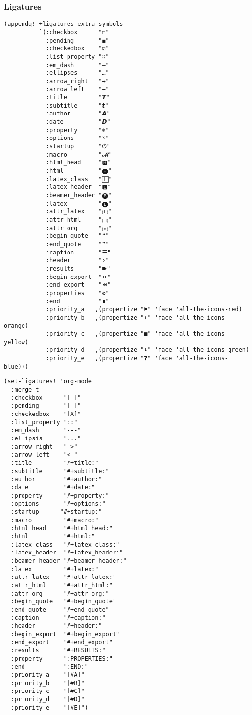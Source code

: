 \documentclass[c]{article}
\theoremstyle{plain}%
\theoremstyle{definition}
\theoremstyle{remark}
\begin{document}
\subsubsection{Ligatures}
\label{sec:orgd05717a}
\begin{verbatim}
(appendq! +ligatures-extra-symbols
          `(:checkbox      "☐"
            :pending       "◼"
            :checkedbox    "☑"
            :list_property "∷"
            :em_dash       "—"
            :ellipses      "…"
            :arrow_right   "→"
            :arrow_left    "←"
            :title         "𝙏"
            :subtitle      "𝙩"
            :author        "𝘼"
            :date          "𝘿"
            :property      "☸"
            :options       "⌥"
            :startup       "⏻"
            :macro         "𝓜"
            :html_head     "🅷"
            :html          "🅗"
            :latex_class   "🄻"
            :latex_header  "🅻"
            :beamer_header "🅑"
            :latex         "🅛"
            :attr_latex    "🄛"
            :attr_html     "🄗"
            :attr_org      "⒪"
            :begin_quote   "❝"
            :end_quote     "❞"
            :caption       "☰"
            :header        "›"
            :results       "🠶"
            :begin_export  "⏩"
            :end_export    "⏪"
            :properties    "⚙"
            :end           "∎"
            :priority_a   ,(propertize "⚑" 'face 'all-the-icons-red)
            :priority_b   ,(propertize "⬆" 'face 'all-the-icons-orange)
            :priority_c   ,(propertize "■" 'face 'all-the-icons-yellow)
            :priority_d   ,(propertize "⬇" 'face 'all-the-icons-green)
            :priority_e   ,(propertize "❓" 'face 'all-the-icons-blue)))
\end{verbatim}
\begin{verbatim}
(set-ligatures! 'org-mode
  :merge t
  :checkbox      "[ ]"
  :pending       "[-]"
  :checkedbox    "[X]"
  :list_property "::"
  :em_dash       "---"
  :ellipsis      "..."
  :arrow_right   "->"
  :arrow_left    "<-"
  :title         "#+title:"
  :subtitle      "#+subtitle:"
  :author        "#+author:"
  :date          "#+date:"
  :property      "#+property:"
  :options       "#+options:"
  :startup      "#+startup:"
  :macro         "#+macro:"
  :html_head     "#+html_head:"
  :html          "#+html:"
  :latex_class   "#+latex_class:"
  :latex_header  "#+latex_header:"
  :beamer_header "#+beamer_header:"
  :latex         "#+latex:"
  :attr_latex    "#+attr_latex:"
  :attr_html     "#+attr_html:"
  :attr_org      "#+attr_org:"
  :begin_quote   "#+begin_quote"
  :end_quote     "#+end_quote"
  :caption       "#+caption:"
  :header        "#+header:"
  :begin_export  "#+begin_export"
  :end_export    "#+end_export"
  :results       "#+RESULTS:"
  :property      ":PROPERTIES:"
  :end           ":END:"
  :priority_a    "[#A]"
  :priority_b    "[#B]"
  :priority_c    "[#C]"
  :priority_d    "[#D]"
  :priority_e    "[#E]")
\end{verbatim}
\end{document}
